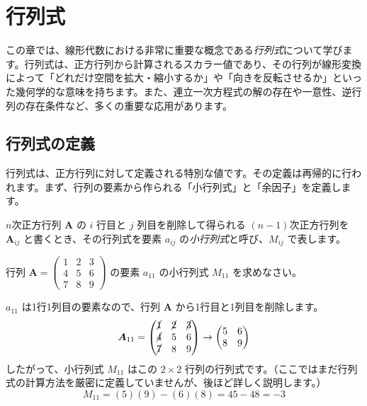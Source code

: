 \section{行列式} \setcounter{ex}{0}

この章では、線形代数における非常に重要な概念である\emph{行列式}について学びます。行列式は、正方行列から計算されるスカラー値であり、その行列が線形変換によって「どれだけ空間を拡大・縮小するか」や「向きを反転させるか」といった幾何学的な意味を持ちます。また、連立一次方程式の解の存在や一意性、逆行列の存在条件など、多くの重要な応用があります。

\subsection{行列式の定義}

行列式は、正方行列に対して定義される特別な値です。その定義は再帰的に行われます。まず、行列の要素から作られる「小行列式」と「余因子」を定義します。

\begin{dfn}[小行列式] \label{minor_determinant}
$n$次正方行列 $\bm{A}$ の $i$ 行目と $j$ 列目を削除して得られる $(n-1)$次正方行列を $\bm{A}_{ij}$ と書くとき、その行列式を要素 $a_{ij}$ の\emph{小行列式}と呼び、$M_{ij}$ で表します。
\end{dfn}

\begin{ex}
行列 $\bm{A} = \begin{pmatrix} 1 & 2 & 3 \\ 4 & 5 & 6 \\ 7 & 8 & 9 \end{pmatrix}$ の要素 $a_{11}$ の小行列式 $M_{11}$ を求めなさい。\par
$a_{11}$ は1行1列目の要素なので、行列 $\bm{A}$ から1行目と1列目を削除します。
\[ \bm{A}_{11} = \begin{pmatrix} \cancel{1} & \cancel{2} & \cancel{3} \\ \cancel{4} & 5 & 6 \\ \cancel{7} & 8 & 9 \end{pmatrix} \rightarrow \begin{pmatrix} 5 & 6 \\ 8 & 9 \end{pmatrix} \]
したがって、小行列式 $M_{11}$ はこの $2 \times 2$ 行列の行列式です。（ここではまだ行列式の計算方法を厳密に定義していませんが、後ほど詳しく説明します。）
\[ M_{11} = (5)(9) - (6)(8) = 45 - 48 = -3 \]
\end{ex}

